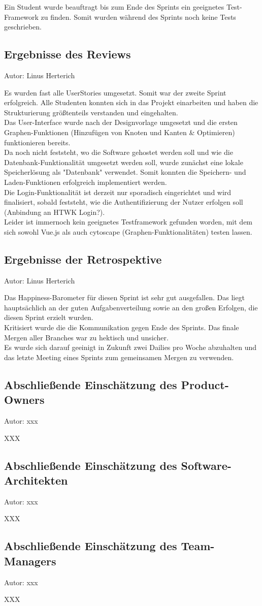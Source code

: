 Ein Student wurde beauftragt bis zum Ende des Sprints ein geeignetes Test-Framework zu finden.
Somit wurden während des Sprints noch keine Tests geschrieben.

\subsection{Ergebnisse des Reviews}
{\small Autor: Linus Herterich}

Es wurden fast alle UserStories umgesetzt. Somit war der zweite Sprint erfolgreich.
Alle Studenten konnten sich in das Projekt einarbeiten und haben die Strukturierung
größtenteils verstanden und eingehalten.
\\ Das User-Interface wurde nach der Designvorlage umgesetzt und die ersten Graphen-Funktionen
(Hinzufügen von Knoten und Kanten \& Optimieren) funktionieren bereits.
\\ Da noch nicht feststeht, wo die Software gehostet werden soll und wie die Datenbank-Funktionalität
umgesetzt werden soll, wurde zunächst eine lokale Speicherlösung als "Datenbank" verwendet. Somit konnten
die Speichern- und Laden-Funktionen erfolgreich implementiert werden.
\\ Die Login-Funktionalität ist derzeit nur sporadisch eingerichtet und wird finalisiert,
sobald feststeht, wie die Authentifizierung der Nutzer erfolgen soll (Anbindung an HTWK Login?).
\\ Leider ist immernoch kein geeignetes Testframework gefunden worden, mit dem sich sowohl Vue.js
als auch cytoscape (Graphen-Funktionalitäten) testen lassen.

\subsection{Ergebnisse der Retrospektive}
{\small Autor: Linus Herterich}

Das Happiness-Barometer für diesen Sprint ist sehr gut ausgefallen. Das liegt hauptsächlich an der guten Aufgabenverteilung
sowie an den großen Erfolgen, die diesen Sprint erzielt wurden.
\\ Kritisiert wurde die die Kommunikation gegen Ende des Sprints. Das finale Mergen aller Branches war zu hektisch und unsicher.
\\ Es wurde sich darauf geeinigt in Zukunft zwei Dailies pro Woche abzuhalten und das letzte Meeting eines Sprints zum gemeinsamen Mergen zu verwenden.

\subsection{Abschließende Einschätzung des Product-Owners}
{\small Autor: xxx}

XXX

\subsection{Abschließende Einschätzung des Software-Architekten}
{\small Autor: xxx}

XXX

\subsection{Abschließende Einschätzung des Team-Managers}
{\small Autor: xxx}

XXX

